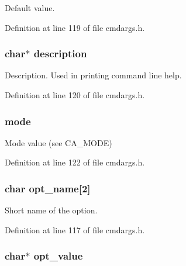 Default value. 



Definition at line 119 of file cmdargs.\-h.

\hypertarget{struct__cmdarg_a8444d6e0dfe2bbab0b5e7b24308f1559}{
\subsubsection[{description}]{\setlength{\rightskip}{0pt plus 5cm}char$\ast$ description}}\label{struct__cmdarg_a8444d6e0dfe2bbab0b5e7b24308f1559}


Description. Used in printing command line help. 



Definition at line 120 of file cmdargs.\-h.

\hypertarget{struct__cmdarg_af7422d78fdb9e20162e80094b054893d}{
\subsubsection[{mode}]{ mode}}\label{struct__cmdarg_af7422d78fdb9e20162e80094b054893d}


Mode value (see C\-A\-\_\-\-M\-O\-D\-E) 



Definition at line 122 of file cmdargs.\-h.

\hypertarget{struct__cmdarg_adccd5b372eb268994f66c0a5f37288f1}{
\subsubsection[{opt\-\_\-name}]{\setlength{\rightskip}{0pt plus 5cm}char opt\-\_\-name\mbox{[}2\mbox{]}}}\label{struct__cmdarg_adccd5b372eb268994f66c0a5f37288f1}


Short name of the option. 



Definition at line 117 of file cmdargs.\-h.

\hypertarget{struct__cmdarg_a646c3fdca1a55fadce39de99ace53684}{
\subsubsection[{opt\-\_\-value}]{\setlength{\rightskip}{0pt plus 5cm}char$\ast$ opt\-\_\-value}}\label{struct__cmdarg_a646c3fdca1a55fadce39de99ace53684}


